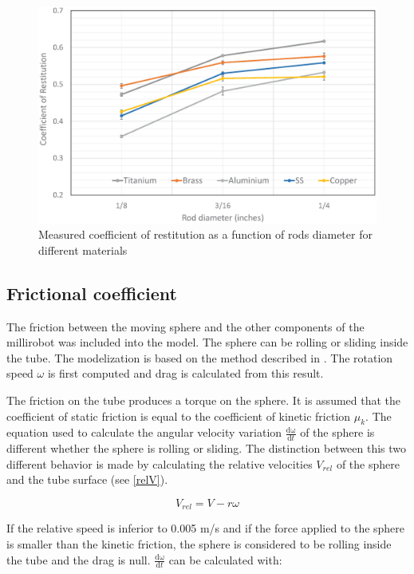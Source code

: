 \documentclass[letterpaper, 10 pt, conference]{ieeeconf}  %
\begin{document}
\begin{figure}
	\includegraphics[width=\columnwidth]{CoR_measurements.eps}
	\caption{Measured coefficient of restitution as a function of rods diameter for different materials}
	\label{CoR_Results}
\end{figure}


\subsection{Frictional coefficient}

The friction between the moving sphere and the other components of the millirobot was included into the model. The sphere can be rolling or sliding inside the tube. The modelization is based on the method described in \cite{00319120303009}. The rotation speed $\omega$ is first computed and drag is calculated from this result.\par
The friction on the tube produces a torque on the sphere. It is assumed that the coefficient of static friction is equal to the coefficient of kinetic friction $\mu_k$. The equation used to calculate the angular velocity variation $\frac{\mathrm{d\omega } }{\mathrm{d} t}$ of the sphere is different whether the sphere is rolling or sliding. The distinction between this two different behavior is made by calculating the relative velocities $V_{rel}$ of the sphere and the tube surface (see \cref{relV}). \par


\begin{equation}
V_{rel}=V-r\omega
\label{relV}
\end{equation}

 
If the relative speed is inferior to 0.005 m/s and if the force applied to the sphere is smaller than the kinetic friction, the sphere is considered to be rolling inside the tube and the drag is null. $\frac{\mathrm{d\omega } }{\mathrm{d} t}$ can be calculated with:
\end{document}
